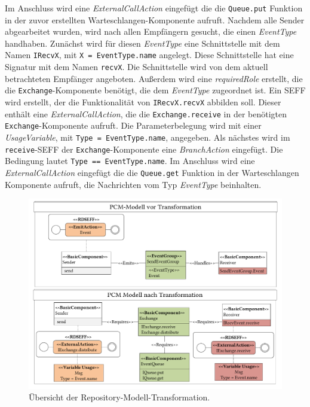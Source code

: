Im Anschluss wird eine \emph{ExternalCallAction} eingefügt die die \texttt{Queue.put} Funktion in der zuvor erstellten Warteschlangen-Komponente aufruft. Nachdem alle Sender abgearbeitet wurden, wird nach allen Empfängern gesucht, die einen \emph{EventType} handhaben. Zunächst wird für diesen \emph{EventType} eine Schnittstelle mit dem Namen \texttt{IRecvX}, mit \texttt{X = EventType.name} angelegt. Diese Schnittstelle hat eine Signatur mit dem Namen \texttt{recvX}. Die Schnittstelle wird von dem aktuell betrachteten Empfänger angeboten. Außerdem wird eine \emph{requiredRole} erstellt, die die \texttt{Exchange}-Komponente benötigt, die dem \emph{EventType} zugeordnet ist. Ein SEFF wird erstellt, der die Funktionalität von \texttt{IRecvX.recvX} abbilden soll. Dieser enthält eine \emph{ExternalCallAction}, die die \texttt{Exchange.receive} in der benötigten \texttt{Exchange}-Komponente aufruft. Die Parameterbelegung wird mit einer \emph{UsageVariable}, mit \texttt{Type = EventType.name}, angegeben. Als nächstes wird im \texttt{receive}-SEFF der \texttt{Exchange}-Komponente eine \emph{BranchAction} eingefügt. Die Bedingung lautet \texttt{Type == EventType.name}. Im Anschluss wird eine \emph{ExternalCallAction} eingefügt die die \texttt{Queue.get} Funktion in der Warteschlangen Komponente aufruft, die Nachrichten vom Typ \emph{EventType} beinhalten.

\begin{figure}
\center
  \includegraphics[width=1.3\textwidth, angle=90]{images/transformation/transformationRepository.pdf}
  \caption{Übersicht der Repository-Modell-Transformation.}
  \label{img:transformationRepository}
\end{figure}



